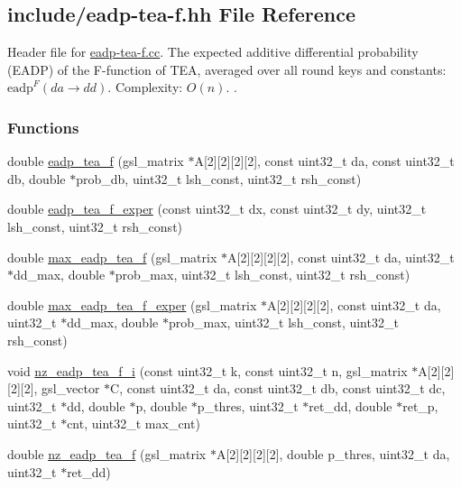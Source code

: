 \hypertarget{eadp-tea-f_8hh}{\subsection{include/eadp-\/tea-\/f.hh \-File \-Reference}
\label{eadp-tea-f_8hh}
}


\-Header file for \hyperlink{eadp-tea-f_8cc}{eadp-\/tea-\/f.\-cc}. \-The expected additive differential probability (\-E\-A\-D\-P) of the \-F-\/function of \-T\-E\-A, averaged over all round keys and constants\-: $\mathrm{eadp}^{F}(da \rightarrow dd)$. \-Complexity\-: $O(n)$. .  


\subsubsection*{\-Functions}
\begin{DoxyCompactItemize}
\item 
double \hyperlink{eadp-tea-f_8hh_a2b46cad5e0dd22f116160ef8fde6e15f}{eadp\-\_\-tea\-\_\-f} (gsl\-\_\-matrix $\ast$\-A\mbox{[}2\mbox{]}\mbox{[}2\mbox{]}\mbox{[}2\mbox{]}\mbox{[}2\mbox{]}, const uint32\-\_\-t da, const uint32\-\_\-t db, double $\ast$prob\-\_\-db, uint32\-\_\-t lsh\-\_\-const, uint32\-\_\-t rsh\-\_\-const)
\item 
double \hyperlink{eadp-tea-f_8hh_ae0d8d129c4fcabd34fae362f4785cca2}{eadp\-\_\-tea\-\_\-f\-\_\-exper} (const uint32\-\_\-t dx, const uint32\-\_\-t dy, uint32\-\_\-t lsh\-\_\-const, uint32\-\_\-t rsh\-\_\-const)
\item 
double \hyperlink{eadp-tea-f_8hh_afecdbe906e7af3483f251d65512f85f7}{max\-\_\-eadp\-\_\-tea\-\_\-f} (gsl\-\_\-matrix $\ast$\-A\mbox{[}2\mbox{]}\mbox{[}2\mbox{]}\mbox{[}2\mbox{]}\mbox{[}2\mbox{]}, const uint32\-\_\-t da, uint32\-\_\-t $\ast$dd\-\_\-max, double $\ast$prob\-\_\-max, uint32\-\_\-t lsh\-\_\-const, uint32\-\_\-t rsh\-\_\-const)
\item 
double \hyperlink{eadp-tea-f_8hh_a677d6b3bc42aae321e2f4a3ec91640d5}{max\-\_\-eadp\-\_\-tea\-\_\-f\-\_\-exper} (gsl\-\_\-matrix $\ast$\-A\mbox{[}2\mbox{]}\mbox{[}2\mbox{]}\mbox{[}2\mbox{]}\mbox{[}2\mbox{]}, const uint32\-\_\-t da, uint32\-\_\-t $\ast$dd\-\_\-max, double $\ast$prob\-\_\-max, uint32\-\_\-t lsh\-\_\-const, uint32\-\_\-t rsh\-\_\-const)
\item 
void \hyperlink{eadp-tea-f_8hh_a934bdfebbd560419bbe519ce81d27bcf}{nz\-\_\-eadp\-\_\-tea\-\_\-f\-\_\-i} (const uint32\-\_\-t k, const uint32\-\_\-t n, gsl\-\_\-matrix $\ast$\-A\mbox{[}2\mbox{]}\mbox{[}2\mbox{]}\mbox{[}2\mbox{]}\mbox{[}2\mbox{]}, gsl\-\_\-vector $\ast$\-C, const uint32\-\_\-t da, const uint32\-\_\-t db, const uint32\-\_\-t dc, uint32\-\_\-t $\ast$dd, double $\ast$p, double $\ast$p\-\_\-thres, uint32\-\_\-t $\ast$ret\-\_\-dd, double $\ast$ret\-\_\-p, uint32\-\_\-t $\ast$cnt, uint32\-\_\-t max\-\_\-cnt)
\item 
double \hyperlink{eadp-tea-f_8hh_a288ad628f2a68f2f32c7c065a2c87e82}{nz\-\_\-eadp\-\_\-tea\-\_\-f} (gsl\-\_\-matrix $\ast$\-A\mbox{[}2\mbox{]}\mbox{[}2\mbox{]}\mbox{[}2\mbox{]}\mbox{[}2\mbox{]}, double p\-\_\-thres, uint32\-\_\-t da, uint32\-\_\-t $\ast$ret\-\_\-dd)
\end{DoxyCompactItemize}


